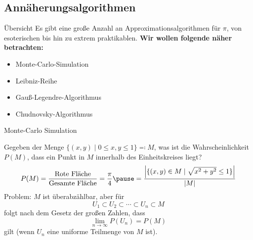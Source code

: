 \documentclass[9pt, t]{beamer}
\begin{document}
\subsection{Annäherungsalgorithmen}

\begin{frame}{Übersicht}
    Es gibt eine große Anzahl an Approximationsalgorithmen für \(\pi\), von
    esoterischen bis hin zu extrem praktikablen.
    \newline\newline
    \textbf{Wir wollen folgende näher betrachten:}
    \begin{itemize}
        \item Monte-Carlo-Simulation
        \item Leibniz-Reihe
        \item Gauß-Legendre-Algorithmus
        \item Chudnovsky-Algorithmus
    \end{itemize}
\end{frame}

\begin{frame}{Monte-Carlo Simulation}
    \begin{minipage}{0.64\textwidth}
        Gegeben der Menge \( \{ (x, y) \mid 0 \le x,y \le 1 \} \eqcolon M \),
        was ist die Wahrscheinlichkeit \( P(M) \), dass ein Punkt in \( M \)
        innerhalb des Einheitskreises liegt?
        \pause
        {%
            \tiny
            \begin{equation*}
                P(M) = \frac{\text{Rote Fläche}}{\text{Gesamte Fläche}}
                = \frac{\pi}{4}
                \pause
                = \frac{\left| \{ (x, y) \in M \mid \sqrt{x^2 + y^2} \le 1 \} \right|}{|M|}
            \end{equation*}
        }
        \pause
        Problem: \( M \) ist überabzählbar\pause, aber für
        \begin{equation*}
            U_1 \subset U_2 \subset \cdots \subset U_n \subset M
        \end{equation*}
        folgt nach dem Gesetz der großen Zahlen, dass
        \begin{equation*}
            \lim_{n \to \infty} P(U_n) = P(M)
        \end{equation*}
        gilt (wenn \( U_n \) eine uniforme Teilmenge von \( M \) ist).
    \end{minipage}
    \begin{minipage}{0.35\textwidth}
        \begin{figure}[H]
            
        \end{figure}
    \end{minipage}
\end{frame}
\end{document}
